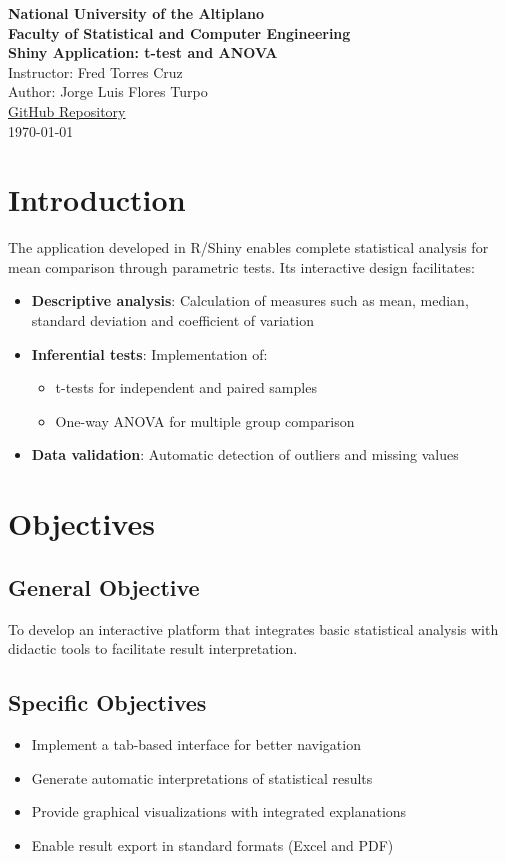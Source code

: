 \documentclass[12pt]{article}
\begin{document}
\begin{center}
    \textbf{\large National University of the Altiplano} \\
    \textbf{Faculty of Statistical and Computer Engineering} \\[5mm]
    \textbf{Shiny Application: t-test and ANOVA} \\[3mm]
    Instructor: Fred Torres Cruz \\
    Author: Jorge Luis Flores Turpo \\[3mm]
    \href{https://github.com/Yorchisflrs/aplicacion_anova_en_R.git}{GitHub Repository} \\
    \today
\end{center}

\section{Introduction}
The application developed in R/Shiny enables complete statistical analysis for mean comparison through parametric tests. Its interactive design facilitates:

\begin{itemize}
    \item \textbf{Descriptive analysis}: Calculation of measures such as mean, median, standard deviation and coefficient of variation
    \item \textbf{Inferential tests}: Implementation of:
    \begin{itemize}
        \item t-tests for independent and paired samples
        \item One-way ANOVA for multiple group comparison
    \end{itemize}
    \item \textbf{Data validation}: Automatic detection of outliers and missing values
\end{itemize}

\section{Objectives}
\subsection{General Objective}
To develop an interactive platform that integrates basic statistical analysis with didactic tools to facilitate result interpretation.

\subsection{Specific Objectives}
\begin{itemize}
    \item Implement a tab-based interface for better navigation
    \item Generate automatic interpretations of statistical results
    \item Provide graphical visualizations with integrated explanations
    \item Enable result export in standard formats (Excel and PDF)
\end{itemize}
\end{document}
